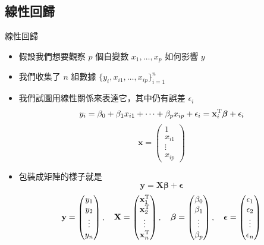 \documentclass{beamer}
\begin{document}
\begin{CJK}{UTF8}{bsmi}
\subsection{線性回歸}
\begin{frame}[allowframebreaks]{線性回歸}
  \begin{itemize}
    \item 假設我們想要觀察 $p$ 個自變數 $x_1, \dots, x_p$ 如何影響 $y$
    \item 我們收集了 $n$ 組數據 $\{y_i, x_{i1}, \dots, x_{ip}\}_{i=1}^n$
    \item 我們試圖用線性關係來表達它，其中仍有誤差 $\epsilon_i$
      \[y_i = \beta_0 + \beta_1 x_{i1} + \cdots + \beta_p x_{ip} + \epsilon_i
	  = \mathbf x_i^{\textup T} \boldsymbol\beta + \epsilon_i\]
      \[\mathbf x = \begin{pmatrix} 1\\ x_{i1}\\ \vdots\\ x_{ip} \end{pmatrix}\]
    \item 包裝成矩陣的樣子就是
      \[\mathbf y = \mathbf X \boldsymbol\beta + \boldsymbol\epsilon\]
      \[\mathbf y = \begin{pmatrix} y_1\\ y_2\\ \vdots\\ y_n \end{pmatrix}, \quad
	\mathbf X = \begin{pmatrix} \mathbf x_1^{\textup T}\\ \mathbf x_2^{\textup T}\\ \vdots\\
	    \mathbf x_n^{\textup T} \end{pmatrix}, \quad
	\boldsymbol\beta = \begin{pmatrix} \beta_0\\ \beta_1\\ \vdots\\ \beta_p \end{pmatrix}, \quad
	\boldsymbol\epsilon = \begin{pmatrix} \epsilon_1\\ \epsilon_2\\ \vdots\\ \epsilon_n \end{pmatrix}\]
  \end{itemize}
\end{frame}


\end{CJK}
\end{document}
